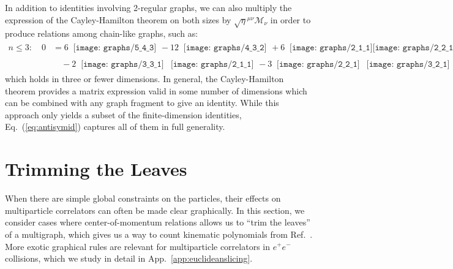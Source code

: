 \documentclass[aps,prd,floatfix,preprintnumbers,twocolumn,groupedaddress,nofootinbib,longbibliography,10pt]{revtex4-1}
\DeclareRobustCommand{\App}[1]{App.~\ref{#1}}
\DeclareRobustCommand{\Eq}[1]{Eq.~(\ref{#1})}
\DeclareRobustCommand{\Ref}[1]{Ref.~\cite{#1}}
\begin{document}
In addition to identities involving 2-regular graphs, we can also multiply the expression of the Cayley-Hamilton theorem on both sizes by $\sqrt{\eta}^{\mu\nu}\mathcal M_\nu$ in order to produce relations among chain-like graphs, such as:
%
\begin{align}
\label{eq:bigchain}
n \leq 3:\quad   0&=
6\,\begin{gathered}\texttt{[image: graphs/5\_4\_3]}\end{gathered} 
-12\,\begin{gathered}\texttt{[image: graphs/4\_3\_2]}\end{gathered}
+6\,\begin{gathered}\texttt{[image: graphs/2\_1\_1]}\texttt{[image: graphs/2\_2\_1]}\end{gathered}
 +4\,\begin{gathered}\texttt{[image: graphs/3\_3\_1]}\end{gathered}
\nonumber\\ &\quad-2\,\begin{gathered}\texttt{[image: graphs/3\_3\_1]}\end{gathered}\begin{gathered}\texttt{[image: graphs/2\_1\_1]}\end{gathered}
-3\,\begin{gathered}\texttt{[image: graphs/2\_2\_1]}\end{gathered}\begin{gathered}\texttt{[image: graphs/3\_2\_1]}\end{gathered},
\end{align}
%
which holds in three or fewer dimensions.
%
In general, the Cayley-Hamilton theorem provides a matrix expression valid in some number of dimensions which can be combined with any graph fragment to give an identity.
%
While this approach only yields a subset of the finite-dimension identities, \Eq{eq:antisymid} captures all of them in full generality.



\section{Trimming the Leaves}
\label{sec:leaves}


When there are simple global constraints on the particles, their effects on multiparticle correlators can often be made clear graphically.
%
In this section, we consider cases where center-of-momentum relations allows us to ``trim the leaves'' of a multigraph, which gives us a way to count kinematic polynomials from \Ref{Boels:2013jua}.
%
More exotic graphical rules are relevant for multiparticle correlators in $e^+ e^-$ collisions, which we study in detail in \App{app:euclideanslicing}.
\end{document}
